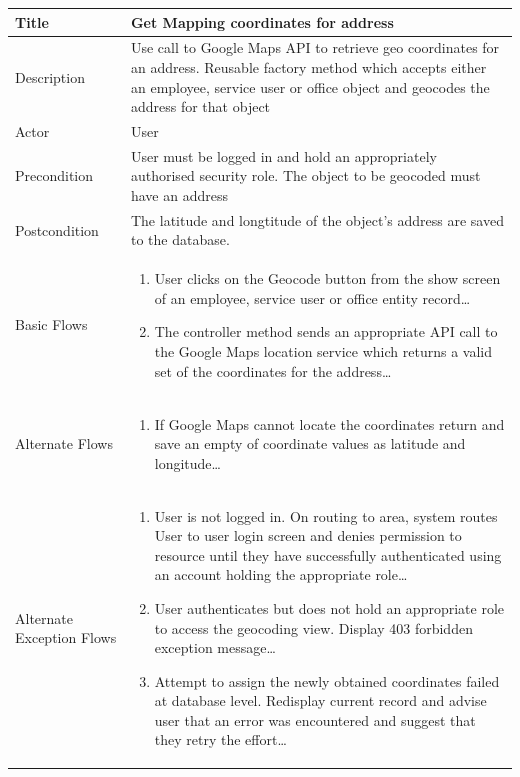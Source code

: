 \documentclass[a4paper,Times New Roman 11pt]{article}
\newcommand\addrow[2]{#1 &#2\\ }
\newcommand\addheading[2]{#1 &#2\\ \hline}
\newcommand\tabularhead{\begin{tabular}{lp{9cm}}
\hline
}
\newcommand\addmulrow[2]{ \begin{minipage}[t][][t]{3cm}#1\end{minipage}%
   &\begin{minipage}[t][][t]{9cm}
    \begin{enumerate} #2   \end{enumerate}
    \end{minipage}\\ }
\newenvironment{usecase}{\tabularhead}
{\hline\end{tabular}}
\begin{document}
\begin{samepage}
\begin{usecase}
    \addheading{Title}{Get Mapping coordinates for address}
  \addheading{Description}{Use call to Google Maps API to retrieve geo coordinates for an address. Reusable factory method which accepts either an employee, service user or office object and geocodes the address for that object}
  \addheading{Actor}{User} 
  \addrow{Precondition}{User must be logged in and hold an appropriately authorised security role. The object to be geocoded must have an address}
  \addrow{Postcondition}{The latitude and longtitude of the object's address are saved to the database.}
  \addmulrow{Basic Flows}{\item User clicks on the Geocode button from the show screen of an employee, service user or office entity record\ldots
  \newpage
  \item The controller method sends an appropriate API call to the Google Maps location service which returns a valid set of the coordinates for the address\ldots}
  \addmulrow{Alternate  Flows}{\item If Google Maps cannot locate the coordinates return and save an empty of coordinate values as latitude and longitude\ldots}
  \addmulrow{Alternate Exception Flows}{\item User is not logged in. On routing to area, system routes User to user login screen and denies permission to resource until they have successfully authenticated using an account holding the appropriate role\ldots
                                                                      \item User authenticates but does not hold an appropriate role to access the geocoding  view. Display 403 forbidden exception message\ldots
                                                                      \item Attempt to assign the newly obtained coordinates failed at database level. Redisplay current record and advise user that an error was encountered and suggest that they retry the effort\ldots}
\end{usecase}


\end{samepage}
\end{document}
